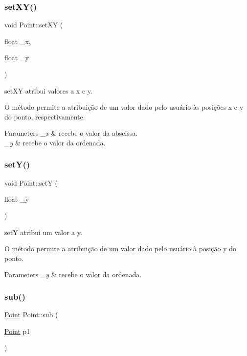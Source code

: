 \subsubsection{\texorpdfstring{set\+X\+Y()}{setXY()}}
{\footnotesize\ttfamily void Point\+::set\+XY (\begin{DoxyParamCaption}\item[{float}]{\+\_\+x,  }\item[{float}]{\+\_\+y }\end{DoxyParamCaption})}



set\+XY atribui valores a x e y. 

O método permite a atribuição de um valor dado pelo usuário às posições x e y do ponto, respectivamente.


\begin{DoxyParams}{Parameters}
{\em \+\_\+x} & recebe o valor da abscissa.\\
\hline
{\em \+\_\+y} & recebe o valor da ordenada. \\
\hline
\end{DoxyParams}
\mbox{\label{class_point_a9868c4601b0ea0c2d0de20fe41ee0e49}} 
\subsubsection{\texorpdfstring{set\+Y()}{setY()}}
{\footnotesize\ttfamily void Point\+::setY (\begin{DoxyParamCaption}\item[{float}]{\+\_\+y }\end{DoxyParamCaption})}



setY atribui um valor a y. 

O método permite a atribuição de um valor dado pelo usuário à posição y do ponto.


\begin{DoxyParams}{Parameters}
{\em \+\_\+y} & recebe o valor da ordenada. \\
\hline
\end{DoxyParams}
\mbox{\label{class_point_a9cf2c53b0a4e6282a6712824bb4e9b00}} 
\subsubsection{\texorpdfstring{sub()}{sub()}}
{\footnotesize\ttfamily \mbox{\hyperlink{class_point}{Point}} Point\+::sub (\begin{DoxyParamCaption}\item[{\mbox{\hyperlink{class_point}{Point}}}]{p1 }\end{DoxyParamCaption})}



